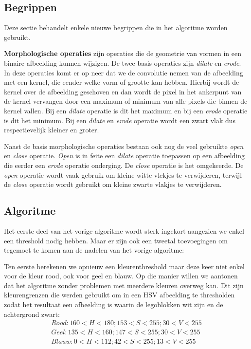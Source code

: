\subsection{Begrippen}
Deze sectie behandelt enkele nieuwe begrippen die in het algoritme worden gebruikt.

\textbf{Morphologische operaties} zijn operaties die de geometrie van vormen in een binaire afbeelding kunnen wijzigen. De twee basis operaties zijn \textit{dilate} en \textit{erode}. In deze operaties komt er op neer dat we de convolutie nemen van de afbeelding met een kernel, die eender welke vorm of grootte kan hebben. Hierbij wordt de kernel over de afbeelding geschoven en dan wordt de pixel in het ankerpunt van de kernel vervangen door een maximum of minimum van alle pixels die binnen de kernel vallen. Bij een \textit{dilate} operatie is dit het maximum en bij een \textit{erode} operatie is dit het minimum. Bij een \textit{dilate} en \textit{erode} operatie wordt een zwart vlak dus respectievelijk kleiner en groter. 

Naast de basis morphologische operaties bestaan ook nog de veel gebruikte \textit{open} en \textit{close} operatie. \textit{Open} is in feite een \textit{dilate} operatie toepassen op een afbeelding die eerder een \textit{erode} operatie onderging. De \textit{close} operatie is het omgekeerde. De \textit{open} operatie wordt vaak gebruik om kleine witte vlekjes te verwijderen, terwijl de \textit{close} operatie wordt gebruikt om kleine zwarte vlakjes te verwijderen.

\subsection{Algoritme}
Het eerste deel van het vorige algoritme wordt sterk ingekort aangezien we enkel een threshold nodig hebben. Maar er zijn ook een tweetal toevoegingen om tegemoet te komen aan de nadelen van het vorige algoritme:

Ten eerste berekenen we opnieuw een kleurenthreshold maar deze keer niet enkel voor de kleur rood, ook voor geel en blauw. Op die manier  willen we aantonen dat het algoritme zonder problemen met meerdere kleuren overweg kan. Dit zijn kleurengrenzen die werden gebruikt om in een HSV afbeelding te thresholden zodat het resultaat een afbeelding is waarin de legoblokken wit zijn en de achtergrond zwart:
\begin{align*}
Rood: 160 < H < 180; 153 < S < 255; 30 < V < 255 \\
Geel: 135 < H < 160; 147 < S < 255; 30 < V < 255 \\
Blauw: 0 < H < 112; 42 < S < 255; 13 < V < 255
\end{align*}

